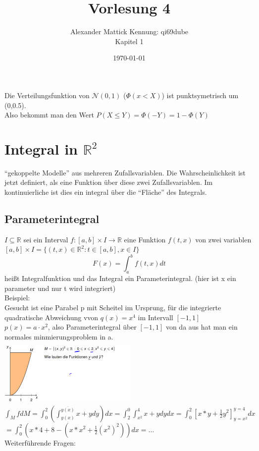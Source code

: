 \documentclass{article}
\author{
Alexander Mattick Kennung: qi69dube\\
Kapitel 1
}
\date{\today}
\title{Vorlesung 4}
\begin{document}
	\maketitle
	Die Verteilungsfunktion von $\mathcal{N}(0,1)$ ($\Phi(x<X)$)  ist punktsymetrisch um (0,0.5).\\
	Also bekommt man den Wert $P(X\leq Y) = \Phi(-Y) = 1-\Phi(Y)$
	\section{Integral in $\mathbb{R}^2$}
	``gekoppelte Modelle'' aus mehreren Zufallsvariablen. Die Wahrscheinlichkeit ist jetzt definiert, als eine Funktion über diese zwei Zufallsvariablen. Im kontinuierliche ist dies ein integral über die ``Fläche'' des Integrals.\\
	\subsection{Parameterintegral}
	$I\subseteq \mathbb{R}$ sei ein Interval $f:[a,b]\times I \to \mathbb{R}$ eine Funktion $f(t,x)$ von zwei variablen $[a,b]\times I = \{(t,x)\in\mathbb{R}^2 : t\in[a,b], x\in I\}$\\
	\[F(x) = \int^b_a f(t,x)dt\]
	heißt Integralfunktion und das Integral ein Parameterintegral. (hier ist x ein parameter und nur t wird integriert)\\
	Beispiel:\\
	Gesucht ist eine Parabel p mit Scheitel im Ursprung, für die integrierte quadratische Abweichung vvon $q(x)=x^4$ im Intervall $[-1,1]$\\
	$p(x)=a\cdot x^2$, also Parameterintegral über $[-1,1]$ von da aus hat man ein normales minmierungsproblem in a.\\
	\includegraphics[width=256px]{yprojezierbarkeit.png}\\
	$\int_M f dM = \int_0^2 (\int _{\underline{y(x)}}^{\overline{y(x)}} x+y dy)dx= \int^0_2\int_{x^2}^4 x+y dy dx = \int ^2_0 [x*y+\frac{1}{2}y^2]^{y=4}_{y=x^2} dx$\\
	$=\int^2_0 (x*4+8-(x*x^2+\frac{1}{2}(x^2)^2))dx =\dots$\\
	Weiterführende Fragen:\\
\end{document}
